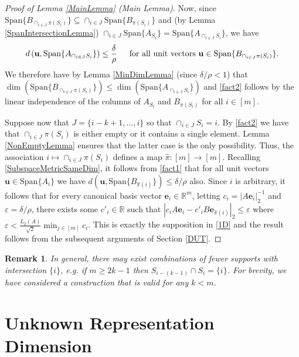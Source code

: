 \documentclass[journal, onecolumn]{IEEEtran}
\newtheorem{remark}{Remark}
\begin{document}
\begin{proof}[Proof of Lemma \ref{MainLemma} (Main Lemma)]
Now, since \mbox{$\text{Span}\{B_{\cap_{i \in J}\pi(S_i)}\} \subseteq \cap_{i \in J} \text{Span}\{B_{\pi(S_i)}\}$} and (by Lemma \ref{SpanIntersectionLemma}) $\cap_{i \in J}  \text{Span}\{A_{S_i}\} = \text{Span}\{A_{\cap_{i \in J}  S_i}\}$, we have
\begin{align}\label{fact1}
d\left( \mathbf{u}, \text{Span}\{A_{\cap_{i \in J} S_i}\} \right) \leq \frac{\delta}{\rho} \indent \text{for all unit vectors } \mathbf{u} \in \text{Span}\{B_{\cap_{i \in J}\pi(S_i)}\}.
\end{align}
We therefore have by Lemma \ref{MinDimLemma} (since $\delta/\rho < 1$) that $\dim(\text{Span}\{B_{\cap_{i \in J}\pi(S_i)}\}) \leq \dim(\text{Span}\{A_{\cap_{i \in J} S_i}\})$ and \eqref{fact2} follows by the linear independence of the columns of $A_{S_i}$ and $B_{\pi(S_i)}$ for all $i \in [m]$.

Suppose now that $J = \{i-k+1, \ldots, i\}$ so that $\cap_{i \in J} S_i = i$. By \eqref{fact2} we have that $\cap_{i \in J} \pi(S_i)$ is either empty or it contains a single element. Lemma \ref{NonEmptyLemma} ensures that the latter case is the only possibility. Thus, the association $i \mapsto \cap_{i \in J} \pi(S_i)$ defines a map $\hat \pi: [m] \to [m]$. Recalling \eqref{SubspaceMetricSameDim}, it follows from \eqref{fact1} that for all unit vectors $\mathbf{u} \in \text{Span}\{A_i\}$ we have $d\left( \mathbf{u}, \text{Span}\{B_{\hat \pi(i)}\}\right) \leq \delta/\rho$ also. Since $i$ is arbitrary, it follows that for every canonical basis vector $\mathbf{e}_i \in \mathbb{R}^m$, letting $c_i = |A\mathbf{e}_i|_2^{-1}$ and $\varepsilon = \delta/\rho$, there exists some $c'_i \in \mathbb{R}$ such that $|c_iA\mathbf{e}_i - c'_iB\mathbf{e}_{\hat \pi(i)}|_2 \leq \varepsilon$ where $\varepsilon < \frac{L_2(A)}{\sqrt{2}} \min_{j \in [m]} c_i$. This is exactly the supposition in \eqref{1D} and the result follows from the subsequent arguments of Section \ref{DUT}. 
\end{proof}

\begin{remark} In general, there may exist combinations of fewer supports with intersection $\{i\}$, e.g. if $m \geq 2k-1$ then $S_{i - (k-1)} \cap S_i = \{i\}$. For brevity, we have considered a construction that is valid for any $k < m$.
\end{remark}

\section{Unknown Representation Dimension}\label{mleqmAppendix}
\end{document}
